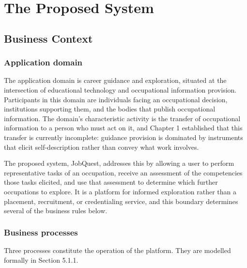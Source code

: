 \newpage
\section{The Proposed System}

\subsection{Business Context}

\subsubsection{Application domain}

The application domain is career guidance and exploration, situated at the intersection of educational technology and occupational information provision. Participants in this domain are individuals facing an occupational decision, institutions supporting them, and the bodies that publish occupational information. The domain's characteristic activity is the transfer of occupational information to a person who must act on it, and Chapter 1 established that this transfer is currently incomplete: guidance provision is dominated by instruments that elicit self-description rather than convey what work involves.

The proposed system, JobQuest, addresses this by allowing a user to perform representative tasks of an occupation, receive an assessment of the competencies those tasks elicited, and use that assessment to determine which further occupations to explore. It is a platform for informed exploration rather than a placement, recruitment, or credentialing service, and this boundary determines several of the business rules below.

\subsubsection{Business processes}

Three processes constitute the operation of the platform. They are modelled formally in Section 5.1.1.

